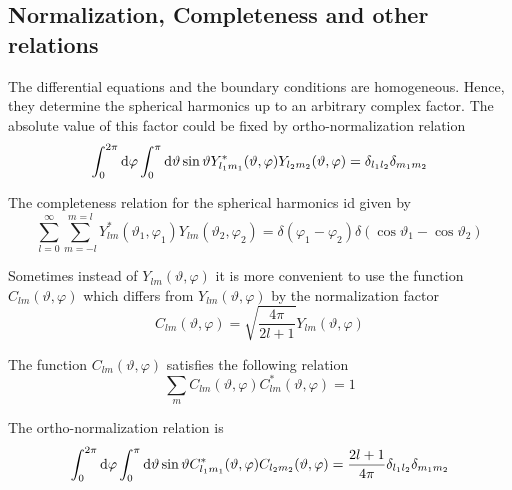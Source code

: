 \subsection[Normalization, Completeness ...]{Normalization, Completeness and other relations}
\par{The differential equations  and the boundary conditions
   are homogeneous. Hence, they determine the spherical
  harmonics up to an arbitrary complex factor. The absolute value of this
  factor could be fixed by ortho-normalization relation}
\begin{equation}
\int_{0}^{2\pi}\text{d} \varphi\int_{0}^{\pi}\text{d} \vartheta \sin \vartheta Y_{l_1m_1}^{*}(\vartheta,\varphi)Y_{l_2m_2}(\vartheta,\varphi)=\delta_{l_1l_2}\delta_{m_1m_2}
\end{equation}
\par{The completeness relation for the spherical harmonics id given by}
\begin{equation}
\label{complet}
\sum_{l=0}^{\infty}\sum_{m=-l}^{m=l}Y_{lm}^{*}(\vartheta_1,\varphi_1)Y_{lm}(\vartheta_2,\varphi_2)=\delta(\varphi_1-\varphi_2)\delta(\cos
\vartheta_1-\cos \vartheta_2)
\end{equation}
\par{Sometimes instead of $Y_{lm}(\vartheta,\varphi)$ it is more convenient to
  use the function $C_{lm}(\vartheta,\varphi)$} which differs from
$Y_{lm}(\vartheta,\varphi)$ by the normalization factor
\begin{equation}
C_{lm}(\vartheta,\varphi)=\sqrt{\frac{4\pi}{2l+1}}Y_{lm}(\vartheta,\varphi) 
\end{equation}
\par{The function $C_{lm}(\vartheta,\varphi)$ satisfies the following relation}
\begin{equation}
\sum_{m}C_{lm}(\vartheta,\varphi)C_{lm}^{*}(\vartheta,\varphi)=1
\end{equation}
\par{The ortho-normalization relation is}
\begin{equation}
\int_{0}^{2\pi}\text{d} \varphi\int_{0}^{\pi}\text{d} \vartheta \sin \vartheta C_{l_1m_1}^{*}(\vartheta,\varphi)C_{l_2m_2}(\vartheta,\varphi)=\frac{2l+1}{4\pi}\delta_{l_1l_2}\delta_{m_1m_2}
\end{equation}
